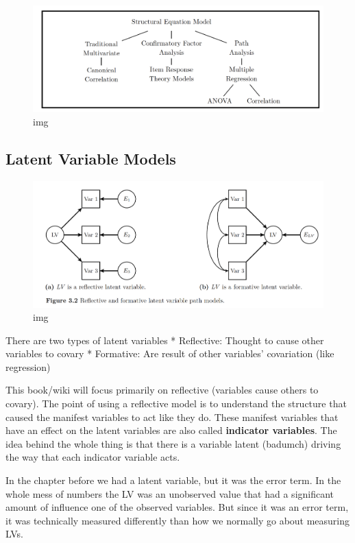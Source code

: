 \documentclass[]{book}
\theoremstyle{definition}
\theoremstyle{definition}
\theoremstyle{definition}
\theoremstyle{remark}
\begin{document}
\begin{figure}
\centering
\includegraphics{img/beaupath7.png}
\caption{img}
\end{figure}

\subsection{Latent Variable Models}\label{latent-variable-models}

\begin{figure}
\centering
\includegraphics{img/beaupath8.png}
\caption{img}
\end{figure}

There are two types of latent variables * Reflective: Thought to cause
other variables to covary * Formative: Are result of other variables'
covariation (like regression)

This book/wiki will focus primarily on reflective (variables cause
others to covary). The point of using a reflective model is to
understand the structure that caused the manifest variables to act like
they do. These manifest variables that have an effect on the latent
variables are also called \textbf{indicator variables}. The idea behind
the whole thing is that there is a variable latent (badumch) driving the
way that each indicator variable acts.

In the chapter before we had a latent variable, but it was the error
term. In the whole mess of numbers the LV was an unobserved value that
had a significant amount of influence one of the observed variables. But
since it was an error term, it was technically measured differently than
how we normally go about measuring LVs.
\end{document}

